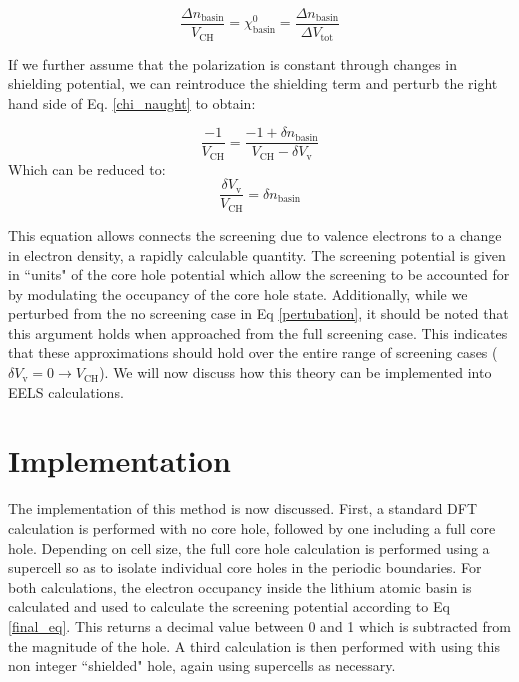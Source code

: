 \begin{equation}
\frac{\Delta n _{\mathrm{basin}}}{V_{\mathrm{CH}}} = \chi^0_{\mathrm{basin}} = \frac{\Delta n _{\mathrm{basin}}}{\Delta V_{\mathrm{tot}}}
\label{chi_naught}
\end{equation}

If we further assume that the polarization is constant through changes in shielding potential, we can reintroduce the shielding term and perturb the right hand side of Eq. \ref{chi_naught} to obtain: 


\begin{equation}
\frac{-1}{V_{\mathrm{CH}}} = \frac{-1+\delta n_{\mathrm{basin}}}{V_{\mathrm{CH}}-\delta V_{\mathrm{v}}}
\label{pertubation}
\end{equation}
Which can be reduced to:
\begin{equation}
\frac{\delta V_{\mathrm{v}}}{V_{\mathrm{CH}}} = \delta n_{\mathrm{basin}}
\label{final_eq}
\end{equation}

This equation allows connects the screening due to valence electrons to a change in electron density, a rapidly calculable quantity.  The screening potential is given in ``units" of the core hole potential which allow the screening to be accounted for by modulating the occupancy of the core hole state.  Additionally, while we perturbed from the no screening case in Eq \ref{pertubation}, it should be noted that this argument holds when approached from the full screening case.  This indicates that these approximations should hold over the entire range of screening cases ($\delta V_{\mathrm{v}} = 0 \to V_{\mathrm{CH}}$).  We will now discuss how this theory can be implemented into EELS calculations.  

\section{Implementation} \label{implementation}
The implementation of this method is now discussed.  First, a standard DFT calculation is performed with no core hole, followed by one including a full core hole. Depending on cell size, the full core hole calculation is performed using a supercell so as to isolate individual core holes in the periodic boundaries. For both calculations, the electron occupancy inside the lithium atomic basin is calculated and used to calculate the screening potential according to Eq \ref{final_eq}.  This returns a decimal value between 0 and 1 which is subtracted from the magnitude of the hole.  A third calculation is then performed with using this non integer ``shielded" hole, again using supercells as necessary.  

